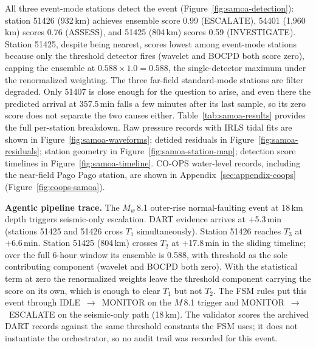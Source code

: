 \documentclass{article}
\begin{document}
All three event-mode stations detect the event
(Figure~\ref{fig:samoa-detection}):
station 51426 (932\,km) achieves ensemble score 0.99 (ESCALATE),
54401 (1{,}960\,km) scores 0.76 (ASSESS), and
51425 (804\,km) scores 0.59 (INVESTIGATE).
Station 51425, despite being nearest, scores lowest among event-mode
stations because only the threshold detector fires (wavelet and BOCPD
both score zero), capping the ensemble at $0.588 \times 1.0 = 0.588$,
the single-detector maximum under the renormalized weighting.
The three far-field standard-mode stations are filter degraded.  Only
51407 is close enough for the question to arise, and even there the
predicted arrival at 357.5\,min falls a few minutes after its last
sample, so its zero score does not separate the two causes either.
Table~\ref{tab:samoa-results} provides the full per-station breakdown.
Raw pressure records with IRLS tidal fits are shown in
Figure~\ref{fig:samoa-waveforms}; detided residuals in
Figure~\ref{fig:samoa-residuals}; station geometry in
Figure~\ref{fig:samoa-station-map}; detection score timelines in
Figure~\ref{fig:samoa-timeline}.
CO-OPS water-level records, including the near-field Pago Pago
station, are shown in Appendix~\ref{sec:appendix-coops}
(Figure~\ref{fig:coops-samoa}).

\noindent\textbf{Agentic pipeline trace.}
The $M_w$\,8.1 outer-rise normal-faulting event at 18\,km depth
triggers seismic-only escalation.  DART evidence arrives at
+5.3\,min (stations 51425 and 51426 cross $T_1$ simultaneously).
Station 51426 reaches $T_3$ at +6.6\,min.
Station 51425 (804\,km) crosses $T_2$ at +17.8\,min in the
sliding timeline; over the full 6-hour window its ensemble is
0.588, with threshold as the sole contributing component
(wavelet and BOCPD both zero).  With the statistical term at zero the
renormalized weights leave the threshold component carrying the score
on its own, which is enough to clear $T_1$ but not $T_2$.
The FSM rules put this event through IDLE~$\to$~MONITOR on the
$M$\,8.1 trigger and MONITOR~$\to$~ESCALATE on the seismic-only path
(18\,km).  The validator scores the archived DART records against
the same threshold constants the FSM uses; it does not instantiate the
orchestrator, so no audit trail was recorded for this event.
\end{document}
